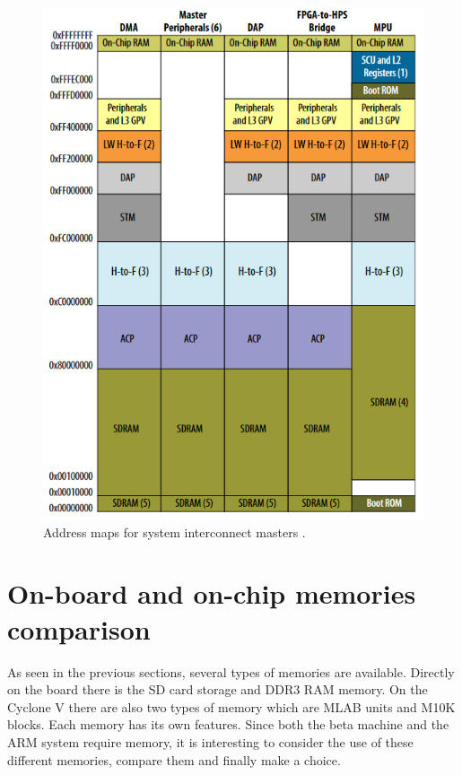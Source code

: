 \begin{figure}[H]
    \centering
    \includegraphics[scale=0.6]{Chapter1-Hardware/res/hps_address_space.PNG}
    \caption{Address maps for system interconnect masters \cite{hps}.}
    \label{fig:cyc5/address_space}
\end{figure}

\section{On-board and on-chip memories comparison}

As seen in the previous sections, several types of memories are available. Directly on the board 
there is the SD card storage and DDR3 RAM memory. On the Cyclone V there are also two types of memory 
which are MLAB units and M10K blocks. Each memory has its own features. Since both the beta 
machine and the ARM system require memory, it is interesting to consider the use of these different 
memories, compare them and finally make a choice.

